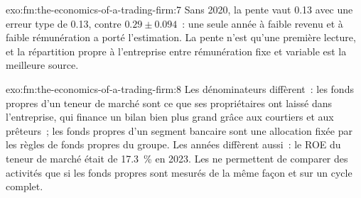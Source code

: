 \begin{solution}{exo:fm:the-economics-of-a-trading-firm:7}
Sans 2020, la pente vaut 0.13 avec une erreur type de 0.13, contre $0.29\pm0.094$~: une seule année à faible revenu et à faible rémunération a porté l'estimation. La
pente n'est qu'une première lecture, et la répartition propre à l'entreprise entre rémunération fixe et variable est la meilleure source.
\end{solution}

\begin{solution}{exo:fm:the-economics-of-a-trading-firm:8}
Les dénominateurs diffèrent~: les fonds propres d'un teneur de marché sont ce que ses propriétaires ont laissé dans l'entreprise, qui finance un bilan bien plus grand grâce aux courtiers
et aux prêteurs~; les fonds propres d'un segment bancaire sont une allocation fixée par les règles de fonds propres du groupe. Les années diffèrent aussi~: le ROE du teneur de marché était de 17.3~\% en
2023. Les  ne permettent de comparer des activités que si les fonds propres sont mesurés de la même façon et sur un cycle complet.
\end{solution}

